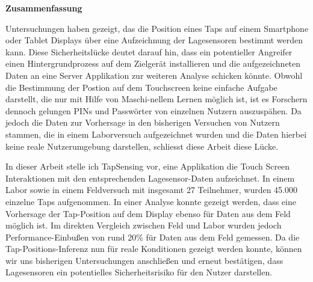 \thispagestyle{empty}
\vspace*{0.2cm}

\begin{center}
    \textbf{Zusammenfassung}
\end{center}

\vspace*{0.5cm}

\noindent

Untersuchungen haben gezeigt, das die Position eines Taps auf einem Smartphone oder Tablet Displays \"uber eine Aufzeichnung der Lagesensoren bestimmt werden kann. Diese Sicherheitsl\"ucke deutet darauf hin, dass ein potentieller Angreifer einen Hintergrundprozess auf dem Zielger\"at installieren und die aufgezeichneten Daten an eine Server Applikation zur weiteren Analyse schicken k\"onnte. Obwohl die Bestimmung der Postion auf dem Touchscreen keine einfache Aufgabe darstellt, die nur mit Hilfe von Maschi-nellem Lernen m\"oglich ist, ist es Forschern dennoch gelungen PINs und Passw\"orter von einzelnen Nutzern auszusp\"ahen. Da jedoch die Daten zur Vorhersage in den bisherigen Versuchen von Nutzern stammen, die in einem Laborversuch aufgezeichnet wurden und die Daten hierbei keine reale Nutzerumgebung darstellen, schliesst diese Arbeit diese L\"ucke.

In dieser Arbeit stelle ich TapSensing vor, eine Applikation die Touch Screen Interaktionen mit den entsprechenden Lagesensor-Daten aufzeichnet. In einem Labor sowie in einem Feldversuch mit insgesamt 27 Teilnehmer, wurden 45.000 einzelne Taps aufgenommen. In einer Analyse konnte gezeigt werden, dass eine Vorhersage der Tap-Position auf dem Display ebenso f\"ur Daten aus dem Feld m\"oglich ist. Im direkten Vergleich zwischen Feld und Labor wurden jedoch Performance-Einbußen von rund 20\% f\"ur Daten aus dem Feld gemessen. Da die Tap-Positions-Inferenz nun f\"ur reale Konditionen gezeigt werden konnte, k\"onnen wir uns bisherigen Untersuchungen anschließen und erneut bestätigen, dass Lagesensoren ein potentielles Sicherheitsrisiko f\"ur den Nutzer darstellen.

